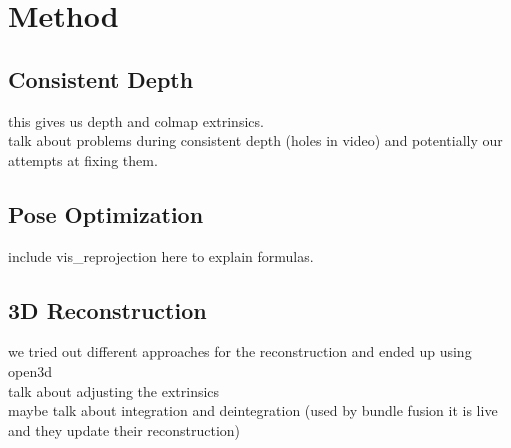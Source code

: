 \chapter{Method}
    \section{Consistent Depth}
        this gives us depth and colmap extrinsics.\\
        talk about problems during consistent depth (holes in video) and potentially our attempts at fixing them.
    \section{Pose Optimization}
        include vis\_reprojection here to explain formulas.
    \section{3D Reconstruction}
        we tried out different approaches for the reconstruction and ended up using open3d\\
        talk about adjusting the extrinsics\\
        maybe talk about integration and deintegration (used by bundle fusion it is live and they update their reconstruction)